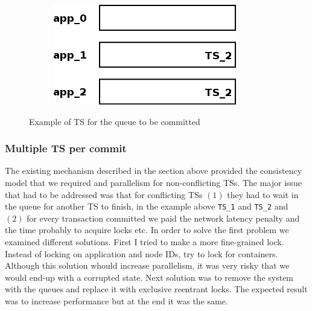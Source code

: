 \begin{figure}
\begin{subfigure}[t]{0.3\textwidth}
    \caption{}
    \label{fig:impl_tx_aggr_sub3}
  \end{subfigure}
  \qquad
  \begin{subfigure}[t]{0.3\textwidth}
    \includegraphics[scale=0.4]{resources/images/Implementation/commit_system_4.png}
    \caption{}
    \label{fig:impl_tx_aggr_sub4}
  \end{subfigure}

  \caption{Example of TS for the queue to be committed}
  \label{fig:impl_tx_aggr_queue}
\end{figure}

\subsubsection{Multiple TS per commit}
\label{sssec:impl_aggr_new}
The existing mechanism described in the section above provided the
consistency model that we required and parallelism for
non-conflicting TSs. The major issue that had to be addressed was that
for conflicting TSs $(1)$ they had to wait in the queue for another TS
to finish, in the example above \texttt{TS\_1} and \texttt{TS\_2} and
$(2)$ for every transaction committed we paid the network latency
penalty and the time probably to acquire locks etc. In order to solve
the first problem we examined different solutions. First I tried to
make a more fine-grained lock. Instead of locking on application and
node IDs, try to lock for containers. Although this solution whould
increase parallelism, it was very risky that we would end-up with a
corrupted state. Next solution was to remove the system with the
queues and replace it with exclusive reentrant locks. The expected
result was to increase performance but at the end it was the same.